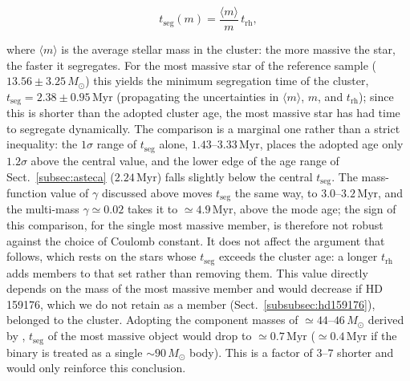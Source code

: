 \documentclass{aa}
\begin{document}
\begin{equation}\label{eq:tseg}
t_{\mathrm{seg}}(m) = \frac{\langle m \rangle}{m}\, t_{\mathrm{rh}},
\end{equation}

where $\langle m \rangle$ is the average stellar mass in the cluster: the more massive the star, the faster it segregates. For the most massive star of the reference sample ($13.56 \pm 3.25\,M_\odot$) this yields the minimum segregation time of the cluster, $t_{\mathrm{seg}} = 2.38 \pm 0.95\,\mathrm{Myr}$ (propagating the uncertainties in $\langle m \rangle$, $m$, and $t_{\mathrm{rh}}$); since this is shorter than the adopted cluster age, the most massive star has had time to segregate dynamically. The comparison is a marginal one rather than a strict inequality: the $1\sigma$ range of $t_{\mathrm{seg}}$ alone, $1.43$--$3.33\,\mathrm{Myr}$, places the adopted age only $1.2\sigma$ above the central value, and the lower edge of the age range of Sect.~\ref{subsec:asteca} ($2.24\,\mathrm{Myr}$) falls slightly below the central $t_{\mathrm{seg}}$. The mass-function value of $\gamma$ discussed above moves $t_{\mathrm{seg}}$ the same way, to $3.0$--$3.2\,\mathrm{Myr}$, and the multi-mass $\gamma\simeq0.02$ takes it to $\simeq4.9\,\mathrm{Myr}$, above the mode age; the sign of this comparison, for the single most massive member, is therefore not robust against the choice of Coulomb constant. It does not affect the argument that follows, which rests on the stars whose $t_{\mathrm{seg}}$ exceeds the cluster age: a longer $t_{\mathrm{rh}}$ adds members to that set rather than removing them. This value directly depends on the mass of the most massive member and would decrease if HD 159176, which we do not retain as a member (Sect.~\ref{subsubsec:hd159176}), belonged to the cluster. Adopting the component masses of $\simeq44$--$46\,M_\odot$ derived by \citet{2016ApJ...832..211P}, $t_{\mathrm{seg}}$ of the most massive object would drop to $\simeq0.7\,\mathrm{Myr}$ ($\simeq0.4\,\mathrm{Myr}$ if the binary is treated as a single $\sim90\,M_\odot$ body). This is a factor of $3$--$7$ shorter and would only reinforce this conclusion.
\end{document}
